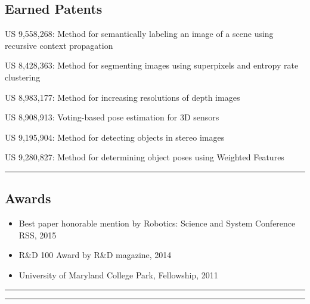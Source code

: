 \documentclass[10pt,letterpaper]{article}
\begin{document}
\subsection*{Earned Patents}
\begin{itemize*}
\item US 9,558,268: Method for semantically labeling an image of a scene using recursive context propagation
\item US 8,428,363: Method for segmenting images using superpixels and entropy rate clustering
\item US 8,983,177: Method for increasing resolutions of depth images
\item US 8,908,913: Voting-based pose estimation for 3D sensors
\item US 9,195,904: Method for detecting objects in stereo images
\item US 9,280,827: Method for determining object poses using Weighted Features
\end{itemize*}

\hrule
\vspace{-0.4em}
\subsection*{Awards}
\begin{itemize}
\item Best paper honorable mention by Robotics: Science and System Conference RSS, 2015\vspace{-2mm}
\item R\&D 100 Award by R\&D magazine, 2014\vspace{-2mm}
\item University of Maryland College Park, Fellowship, 2011
\end{itemize}
\hrule
\clearpage

\hrule
\vspace{-0.4em}
\end{document}
